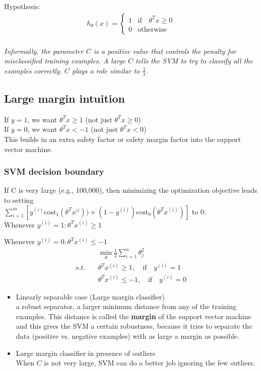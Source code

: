 Hypothesis:\\
\begin{align*}
h_\theta(x)  = \left\{ \begin{array}{rll}
         1 & \text{if} \quad \theta^Tx \geq 0\\
         0 & \text{otherwise}
                \end{array}\right.\\
\end{align*}

\emph{\textcolor{Bittersweet}{Informally, the  parameter $C$ is a positive value that controls the penalty for misclassified training examples. A large  $C$ tells the SVM to try to classify all the examples correctly.  $C$ plays a role similar to $\frac{1}{\lambda}$.}}
%
\subsection{Large margin intuition}
If $y = 1$, we want $\theta^Tx \geq 1$ (not just $\theta^Tx \geq 0$)\\
If $y = 0$, we want $\theta^Tx < -1$ (not just $\theta^Tx < 0$)\\
This builds in an extra safety factor or safety margin factor into the support vector machine.

\subsubsection{SVM decision boundary}
If C is very large (e.g., 100,000), then minimizing the optimization objective leads to setting\\

$\sum_{i=1}^m \left[ y^{(i)}\text{cost}_1(\theta^Tx^{(i})) + (1-y^{(i)})\text{cost}_0(\theta^Tx^{(i)}) \right]$ to $0$:\\

Whenever $y^{(i)} = 1: \theta^Tx^{(i)} \geq 1$

Whenever $y^{(i)} = 0: \theta^Tx^{(i)} \leq -1$
\begin{align}
&\underset{\theta}{\min}\frac{1}{2}\sum_{i=1}^{n}\theta_j^2 \nonumber \\
s.t. \quad &\theta^Tx^{(i)} \geq 1, \quad \text{if} \quad y^{(i)} = 1 \nonumber \\
&\theta^Tx^{(i)} \leq -1, \quad \text{if} \quad y^{(i)} = 0
\end{align}
 
\begin{itemize}
\item
Linearly separable case (Large margin classifier)\\
a robust separator, a larger minimum distance from any of the training examples. This distance is called the \textbf{margin} of the support vector machine and this gives the SVM a certain robustness, because it tries to separate the data (positive vs. negative examples) with as large a margin as possible. 
\item
Large margin classifier in presence of outliers\\
When $C$ is not very large, SVM can do a better job ignoring the few outliers.
\end{itemize}

